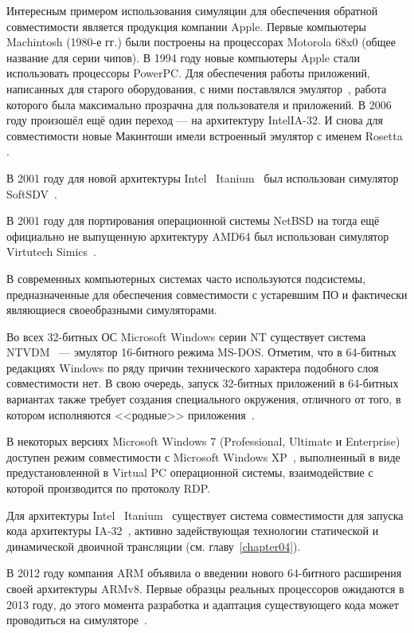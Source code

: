 \begin{itemize*}

\item Интересным примером использования симуляции для обеспечения обратной совместимости является продукция компании Apple.  Первые компьютеры Machintosh (1980-е гг.) были построены на процессорах Motorola 68x0 (общее название для серии чипов). В 1994 году новые компьютеры Apple стали использовать процессоры PowerPC. Для обеспечения работы приложений, написанных для старого оборудования, с ними поставлялся эмулятор~\cite{apple-ppcsoftware}, работа которого была максимально прозрачна для пользователя и приложений. В 2006 году произошёл ещё один переход --- на архитектуру Intel\textregistered IA-32. И снова для совместимости новые Макинтоши имели встроенный эмулятор с именем Rosetta \cite{apple-rosetta, macosx-internals}.

\item В 2001 году для новой архитектуры Intel\textregistered~ Itanium\texttrademark~ был использован симулятор SoftSDV~\cite{softsdv-ia64}.

\item В 2001 году для портирования операционной системы NetBSD на тогда ещё официально не выпущенную архитектуру AMD64 был использован симулятор Virtutech Simics~\cite{netbsd-amd64}.

\item В современных компьютерных системах часто используются подсистемы, предназначенные для обеспечения совместимости с устаревшим ПО и фактически являющиеся своеобразными симуляторами.

\item Во всех 32-битных ОС Microsoft Windows серии NT существует система NTVDM~\cite{ntvdm} --- эмулятор 16-битного режима MS-DOS. Отметим, что в 64-битных редакциях Windows по ряду причин технического характера подобного слоя совместимости нет. В свою очередь, запуск 32-битных приложений в 64-битных вариантах также требует создания специального окружения, отличного от того, в котором исполняются <<родные>> приложения~\cite[глава 3]{wininternals6-pt1}.

\item В некоторых версиях Microsoft Windows 7 (Professional, Ultimate и Enterprise) доступен режим совместимости с Microsoft Windows XP~\cite{winxp-mode}, выполненный в виде предустановленной в Virtual PC операционной системы, взаимодействие с которой производится по протоколу RDP.

\item Для архитектуры Intel\textregistered~ Itanium\texttrademark~ существует система совместимости для запуска кода архитектуры IA-32~\cite{Baraz03ia-32execution}, активно задействующая технологии статической и динамической двоичной трансляции (см. главу~\ref{chapter04}).

\item В 2012 году компания ARM объявила о введении нового 64-битного расширения своей архитектуры ARMv8. Первые образцы реальных процессоров ожидаются в 2013 году, до этого момента разработка и адаптация существующего кода может проводиться на симуляторе~\cite{armv8}.
\end{itemize*}

